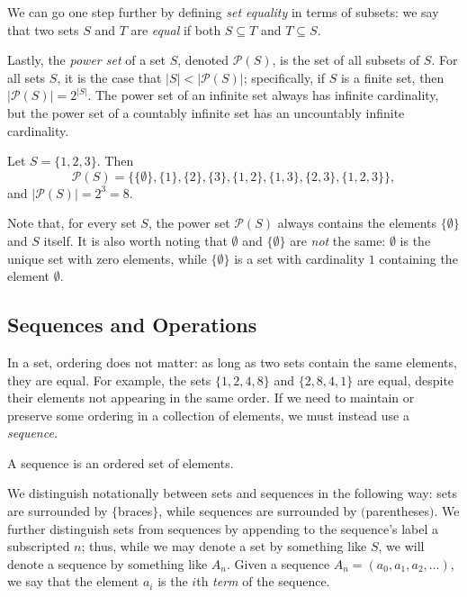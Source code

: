 We can go one step further by defining \emph{set equality} in terms of subsets: we say that two sets $S$ and $T$ are \emph{equal} if both $S \subseteq T$ and $T \subseteq S$.

Lastly, the \emph{power set} of a set $S$, denoted $\mathcal{P}(S)$, is the set of all subsets of $S$. For all sets $S$, it is the case that $|S| < |\mathcal{P}(S)|$; specifically, if $S$ is a finite set, then $|\mathcal{P}(S)| = 2^{|S|}$. The power set of an infinite set always has infinite cardinality, but the power set of a countably infinite set has an uncountably infinite cardinality.

\begin{example}
Let $S = \{1, 2, 3\}$. Then
\begin{equation*}
\mathcal{P}(S) = \{\{\emptyset\}, \{1\}, \{2\}, \{3\}, \{1,2\}, \{1,3\}, \{2,3\}, \{1,2,3\}\},
\end{equation*}
and $|\mathcal{P}(S)| = 2^{3} = 8$.
\end{example}

Note that, for every set $S$, the power set $\mathcal{P}(S)$ always contains the elements $\{\emptyset\}$ and $S$ itself. It is also worth noting that $\emptyset$ and $\{\emptyset\}$ are \emph{not} the same: $\emptyset$ is the unique set with zero elements, while $\{\emptyset\}$ is a set with cardinality $1$ containing the element $\emptyset$.

\subsection*{Sequences and Operations}

In a set, ordering does not matter: as long as two sets contain the same elements, they are equal. For example, the sets $\{1, 2, 4, 8\}$ and $\{2, 8, 4, 1\}$ are equal, despite their elements not appearing in the same order. If we need to maintain or preserve some ordering in a collection of elements, we must instead use a \emph{sequence}.

\begin{definition}[Sequence]
A sequence is an ordered set of elements.
\end{definition}

We distinguish notationally between sets and sequences in the following way: sets are surrounded by $\{$braces$\}$, while sequences are surrounded by $($parentheses$)$. We further distinguish sets from sequences by appending to the sequence's label a subscripted $n$; thus, while we may denote a set by something like $S$, we will denote a sequence by something like $A_{n}$. Given a sequence $A_{n} = (a_{0}, a_{1}, a_{2}, \dots)$, we say that the element $a_{i}$ is the $i$th \emph{term} of the sequence.

